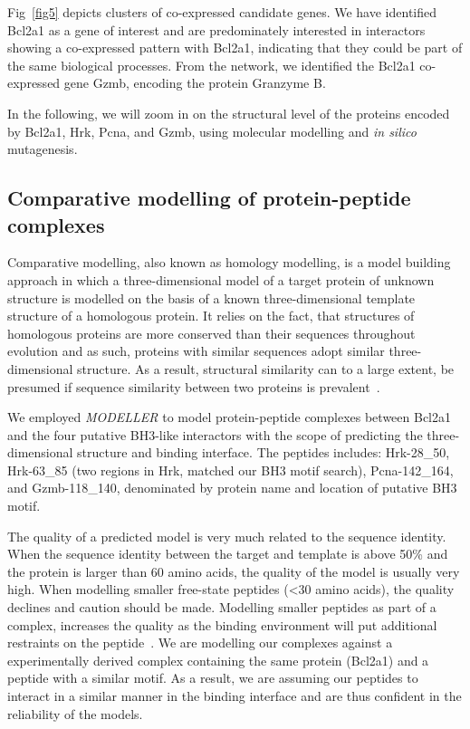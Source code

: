 \documentclass[10pt,letterpaper]{article}
\begin{document}
Fig~\ref{fig5} depicts clusters of co-expressed candidate genes. We have identified Bcl2a1 as a gene of interest and are predominately interested in interactors showing a co-expressed pattern with Bcl2a1, indicating that they could be part of the same biological processes. From the network, we identified the Bcl2a1 co-expressed gene Gzmb, encoding the protein Granzyme B. 

\smallskip

In the following, we will zoom in on the structural level of the proteins encoded by Bcl2a1, Hrk, Pcna, and Gzmb, using molecular modelling and \textit{in silico} mutagenesis.

\subsection*{Comparative modelling of protein-peptide complexes}
Comparative modelling, also known as homology modelling, is a model building approach in which a three-dimensional model of a target protein of unknown structure is modelled on the basis of a known three-dimensional template structure of a homologous protein. It relies on the fact, that structures of homologous proteins are more conserved than their sequences throughout evolution and as such, proteins with similar sequences adopt similar three-dimensional structure. As a result, structural similarity can to a large extent, be presumed if sequence similarity between two proteins is prevalent~\cite{Lesk1980,Marti-Renom2000}.

We employed \textit{MODELLER} to model protein-peptide complexes between Bcl2a1 and the four putative BH3-like interactors with the scope of predicting the three-dimensional structure and binding interface. The peptides includes: Hrk-28\_50, Hrk-63\_85 (two regions in Hrk, matched our BH3 motif search), Pcna-142\_164, and Gzmb-118\_140, denominated by protein name and location of putative BH3 motif. 

The quality of a predicted model is very much related to the sequence identity. When the sequence identity between the target and template is above 50\% and the protein is larger than 60 amino acids, the quality of the model is usually very high. When modelling smaller free-state peptides (\textless 30 amino acids), the quality declines and caution should be made. Modelling smaller peptides as part of a complex, increases the quality as the binding environment will put additional restraints on the peptide~\cite{zvelebil2008}. We are modelling our complexes against a experimentally derived complex containing the same protein (Bcl2a1) and a peptide with a similar motif. As a result, we are assuming our peptides to interact in a similar manner in the binding interface and are thus confident in the reliability of the models.  
\end{document}
